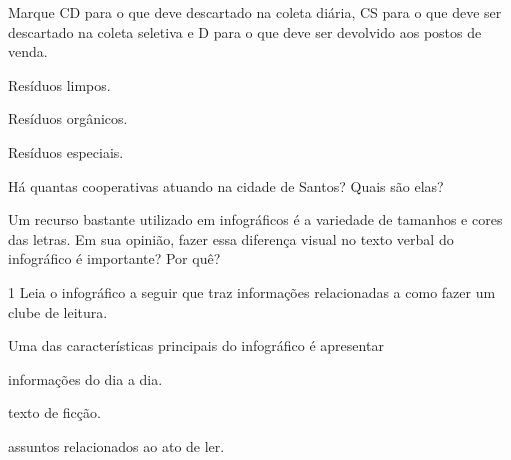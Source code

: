 \begin{escolha}
\begin{escolha}
\begin{escolha}
\item Marque CD para o que deve descartado na coleta diária, CS para o que
deve ser descartado na coleta seletiva e D para o que deve ser devolvido
aos postos de venda.

\begin{boxlist}
\boxlist[\rosa{CS}] Resíduos limpos.

\boxlist[\rosa{CD}] Resíduos orgânicos.

\boxlist[\rosa{D}] Resíduos especiais.
\end{boxlist}

\item Há quantas cooperativas atuando na cidade de Santos? Quais são elas?


\item Um recurso bastante utilizado em infográficos é a variedade de
tamanhos e cores das letras. Em sua opinião, fazer essa diferença visual
no texto verbal do infográfico é importante? Por quê?

\end{escolha}


\num{1} Leia o infográfico a seguir que traz informações relacionadas a
como fazer um clube de leitura.



Uma das características principais do infográfico é apresentar

\begin{boxlist}
\item informações do dia a dia.

\item texto de ficção.

\item assuntos relacionados ao ato de ler.


\end{boxlist}
\end{escolha}
\end{escolha}
